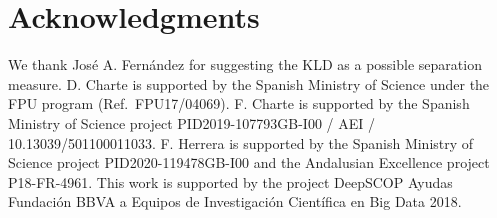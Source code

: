 %





  \section*{Acknowledgments}

We thank Jos{\'e} A. Fernández for suggesting the KLD as a possible separation measure. D. Charte is supported by the Spanish Ministry of Science under the FPU program (Ref.~FPU17/04069). F. Charte is supported by the Spanish Ministry of Science project PID2019-107793GB-I00 / AEI / 10.13039/501100011033. F. Herrera is supported by the Spanish Ministry of Science project PID2020-119478GB-I00  and the Andalusian Excellence project P18-FR-4961. This work is supported by the project DeepSCOP Ayudas Fundaci\'on BBVA a Equipos de Investigación Científica en Big Data 2018.




